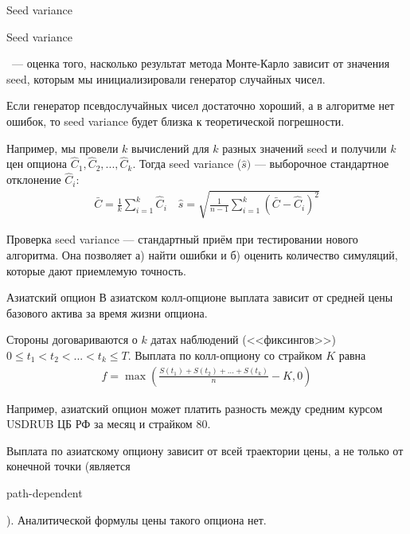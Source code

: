 \documentclass{beamer}
\newcommand{\en}[1]{\begin{otherlanguage}{english}#1\end{otherlanguage}}
\begin{document}
\begin{frame}{Seed variance}
\justify
\en{Seed variance}\ --- оценка того, насколько результат метода Монте-Карло зависит от значения seed, которым мы инициализировали генератор случайных чисел.

\justify
Если генератор псевдослучайных чисел достаточно хороший, а в алгоритме нет ошибок, то seed variance будет близка к теоретической погрешности.

\justify
Например, мы провели $k$ вычислений для $k$ разных значений seed и получили $k$ цен опциона $\hat{C}_1, \hat{C}_2,...,\hat{C}_k$. Тогда seed variance ($\hat{s})$
 --- выборочное стандартное отклонение $\hat{C}_i$:
\begin{align*}
\bar{C} = \frac{1}{k}\sum\limits_{i=1}^{k}\hat{C}_i \quad \hat{s} = \sqrt{\frac{1}{n-1}\sum\limits_{i=1}^{k}(\bar{C} - \hat{C}_i)^2} 
\end{align*}

\justify
Проверка seed variance --- стандартный приём при тестировании нового алгоритма. Она позволяет а) найти ошибки и б) оценить количество симуляций, которые дают приемлемую точность.
\end{frame}



\begin{frame}{Азиатский опцион}
\justify
В азиатском колл-опционе выплата зависит от средней цены базового актива за время жизни опциона.

\justify
Стороны договариваются о $k$ датах наблюдений (<<фиксингов>>) $0 \le t_1 < t_2 < ... < t_k \le T$. Выплата по колл-опциону со страйком $K$ равна
\begin{align*}
f = \max\left(\frac{S(t_1) + S(t_2) + ... + S(t_k)}{n} - K, 0\right)
\end{align*}

\justify
Например, азиатский опцион может платить разность между средним курсом USDRUB ЦБ РФ за месяц и страйком $80$. 

\justify
Выплата по азиатскому опциону зависит от всей траектории цены, а не только от конечной точки (является \en{path-dependent}). Аналитической формулы цены такого опциона нет. 
\end{frame}
\end{document}
